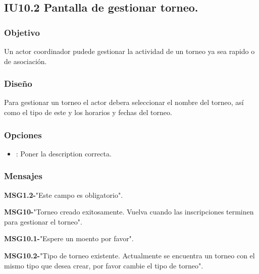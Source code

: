 \subsection{IU10.2 Pantalla de gestionar torneo.}

\subsubsection{Objetivo}
	Un actor coordinador pudede gestionar la actividad de un torneo ya sea rapido o de asociación.

\subsubsection{Diseño}
  Para gestionar un torneo el actor debera seleccionar el nombre del torneo, así como el tipo de este y los horarios y fechas del torneo.


\subsubsection{Opciones}
\begin{itemize}
	\item {}: Poner la description correcta.
\end{itemize}

\subsubsection{Mensajes}
	\begin{Citemize}
		\item {\bf MSG1.2-}"Este campo es obligatorio".
		\item {\bf MSG10-}"Torneo creado exitosamente. Vuelva cuando las inscripciones terminen para gestionar el torneo".
		\item {\bf MSG10.1-}"Espere un moento por favor".
		\item {\bf MSG10.2-}"Tipo de torneo existente. Actualmente se encuentra un torneo con el mismo tipo que desea crear, por favor cambie el tipo de torneo".
\end{Citemize}